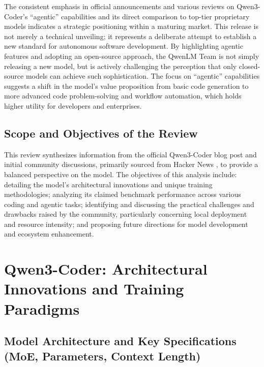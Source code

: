 The consistent emphasis in official announcements and various reviews on Qwen3-Coder's ``agentic'' capabilities and its direct comparison to top-tier proprietary models indicates a strategic positioning within a maturing market.\cite{qwenlm_qwen3coder_blog_2025, gupta_qwen3coder_medium_2025, youtube_qwen3coder_review_2025, ainvest_qwen3coder_2025, github_qwenlm_qwen3coder_2025} This release is not merely a technical unveiling; it represents a deliberate attempt to establish a new standard for autonomous software development. By highlighting agentic features and adopting an open-source approach, the QwenLM Team is not simply releasing a new model, but is actively challenging the perception that only closed-source models can achieve such sophistication. The focus on ``agentic'' capabilities suggests a shift in the model's value proposition from basic code generation to more advanced code problem-solving and workflow automation, which holds higher utility for developers and enterprises.

\subsection{Scope and Objectives of the Review}

This review synthesizes information from the official Qwen3-Coder blog post \cite{qwenlm_qwen3coder_blog_2025} and initial community discussions, primarily sourced from Hacker News \cite{hackernews_qwen3coder_2025, reddit_localllama_qwen3coder_1_2025}, to provide a balanced perspective on the model. The objectives of this analysis include: detailing the model's architectural innovations and unique training methodologies; analyzing its claimed benchmark performance across various coding and agentic tasks; identifying and discussing the practical challenges and drawbacks raised by the community, particularly concerning local deployment and resource intensity; and proposing future directions for model development and ecosystem enhancement.

\section{Qwen3-Coder: Architectural Innovations and Training Paradigms}

\subsection{Model Architecture and Key Specifications (MoE, Parameters, Context Length)}

